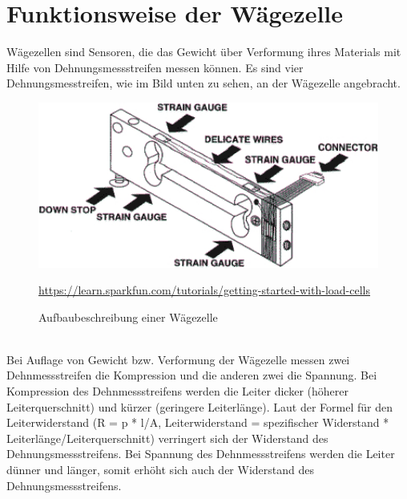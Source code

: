 \section{Funktionsweise der Wägezelle}
Wägezellen sind Sensoren, die das Gewicht über Verformung ihres Materials mit Hilfe von Dehnungsmessstreifen messen können. Es sind vier Dehnungsmesstreifen, wie im Bild unten zu sehen, an der Wägezelle angebracht.
\begin{figure}[ht]
    \center
    \includegraphics[width=15cm]{Bilder/waegezelle-aufbaubeschreibung.jpg}\\
    \caption{Aufbaubeschreibung einer Wägezelle}
    \begin{flushleft} \quelle\url{https://learn.sparkfun.com/tutorials/getting-started-with-load-cells} \end{flushleft}
\end{figure}\\
Bei Auflage von Gewicht bzw. Verformung der Wägezelle messen zwei Dehnmessstreifen die Kompression und die anderen zwei die Spannung. Bei Kompression des Dehnmessstreifens werden die Leiter dicker (höherer Leiterquerschnitt) und kürzer (geringere Leiterlänge). Laut der Formel für den Leiterwiderstand (R = p * l/A, Leiterwiderstand = spezifischer Widerstand * Leiterlänge/Leiterquerschnitt) verringert sich der Widerstand des Dehnungsmessstreifens. Bei Spannung des Dehnmessstreifens werden die Leiter dünner und länger, somit erhöht sich auch der Widerstand des Dehnungsmessstreifens. 
\newpage
